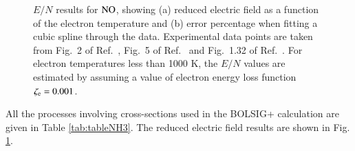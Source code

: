 \begin{figure}[h]
\caption{$E/N$ results for $\rm NO$, showing (a) reduced electric field as a function of the electron temperature and (b) error percentage when fitting a cubic spline through the data. Experimental data points are taken from Fig.\ 2 of Ref.\ , Fig.\ 5 of Ref.\  and Fig.\ 1.32 of Ref.\ . For electron temperatures less than 1000 K, the $E/N$ values are estimated by assuming a value of electron energy loss function $\zeta_{\rm e} = 0.001$. }
\label{fig:electronimpact_3}
\end{figure}
%
All the processes involving cross-sections used in the BOLSIG+ calculation are given in Table \ref{tab:tableNH3}. The reduced electric field results are shown in Fig. \ref{fig:electronimpact_3}.
%
